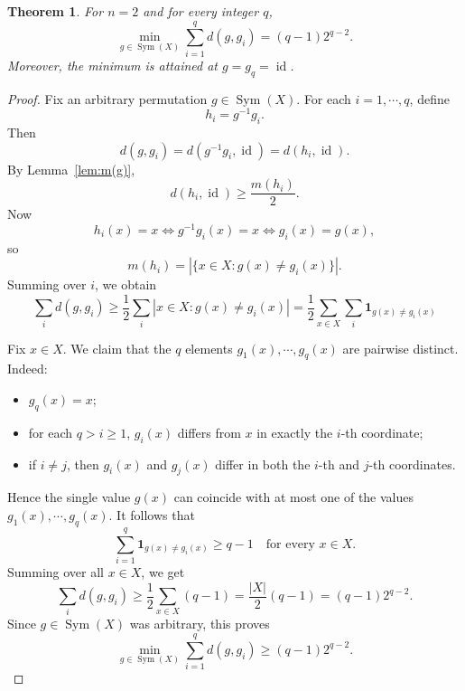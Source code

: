 \documentclass[11pt,oneside,letterpaper]{article}
\numberwithin{equation}{section}
\newtheorem{theorem}{Theorem}
\theoremstyle{definition}
\theoremstyle{remark}
\DeclareMathOperator{\id}{id}
\DeclareMathOperator{\Sym}{Sym}
\begin{document}
\begin{theorem}
  \label{thm:1TN}
  For $n=2$ and for every integer $q$,
  \begin{equation}
    \min_{g\in \Sym(X)} \sum^q_{i=1} d(g,g_i) = (q-1)2^{q-2}.
  \end{equation}
  Moreover, the minimum is attained at $g=g_q=\id$.
\end{theorem}
\begin{proof}
  Fix an arbitrary permutation $g\in \Sym(X)$. For each $i=1,\cdots,q$, define
  \begin{equation}
    h_i = g^{-1}g_i.
  \end{equation}
  Then
  \begin{equation}
    d(g,g_i) = d(g^{-1}g_i,\id) = d(h_i,\id).
  \end{equation}
  By Lemma~\ref{lem:m(g)},
  \begin{equation}
    d(h_i,\id) \ge \frac{m(h_i)}{2}.
  \end{equation}
  Now
  \begin{equation}
    h_i(x)=x \Longleftrightarrow g^{-1}g_i(x) = x \Longleftrightarrow g_i(x) = g(x),
  \end{equation}
  so
  \begin{equation}
    \label{eq:1TN_cp}
    m(h_i) = |\{x\in X: g(x)\ne g_i(x)\}|.
  \end{equation}
  Summing over $i$, we obtain
  \begin{equation}
        \label{eq:1TN_cp2}
    \sum_i d(g,g_i) \ge \frac{1}{2} \sum_i|x\in X: g(x) \ne g_i(x)| = \frac{1}{2} \sum_{x\in X}\sum_i \mathbf{1}_{g(x)\ne g_i(x)}
  \end{equation}

  Fix $x\in X$. We claim that the $q$ elements $g_1(x),\cdots,g_q(x)$ are pairwise distinct. Indeed:
  \begin{itemize}
  \item $g_q(x)=x$;
  \item for each $q>i\ge1$, $g_i(x)$ differs from $x$ in exactly the $i$-th coordinate;
  \item if $i\ne j$, then $g_i(x)$ and $g_j(x)$ differ in both the $i$-th and $j$-th coordinates.
  \end{itemize}
  Hence the single value $g(x)$ can coincide with at most one of the values $g_1(x),\cdots,g_q(x)$. It follows that
  \begin{equation}
    \sum^q_{i=1} \mathbf{1}_{g(x)\ne g_i(x)} \ge q-1 \quad \text{for every } x\in X.
  \end{equation}
  Summing over all $x\in X$, we get
  \begin{equation}
    \sum_i d(g,g_i) \ge \frac{1}{2}\sum_{x\in X} (q-1) = \frac{|X|}{2} (q-1) = (q-1)2^{q-2}.
  \end{equation}
  Since $g\in \Sym(X)$ was arbitrary, this proves
  \begin{equation}
    \min_{g\in \Sym(X)} \sum_{i=1}^q d(g,g_i) \ge (q-1)2^{q-2}.
  \end{equation}


\end{proof}
\end{document}
